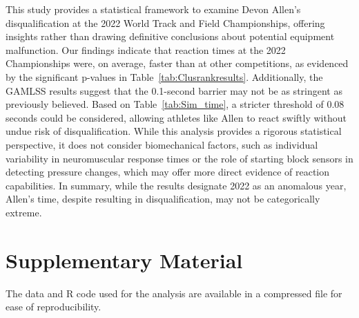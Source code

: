 \documentclass[12pt, letterpaper]{article}
\begin{document}
This study provides a statistical framework to examine Devon Allen’s
disqualification at the 2022 World Track and Field Championships,
offering insights rather than drawing definitive conclusions about
potential equipment malfunction. Our findings indicate that reaction
times at the 2022 Championships were, on average, faster than at other
competitions, as evidenced by the significant p-values in
Table~\ref{tab:Clusrankresults}. Additionally, the GAMLSS results
suggest that the 0.1-second barrier may not be as stringent as
previously believed. Based on Table~\ref{tab:Sim_time}, a stricter
threshold of 0.08 seconds could be considered, allowing athletes like
Allen to react swiftly without undue risk of disqualification. While
this analysis provides a rigorous statistical perspective, it does not
consider biomechanical factors, such as individual variability in
neuromuscular response times or the role of starting block sensors in
detecting pressure changes, which may offer more direct evidence of
reaction capabilities. In summary, while the results designate 2022 as
an anomalous year, Allen’s time, despite resulting in
disqualification, may not be categorically extreme.


\section*{Supplementary Material}
The data and R code used for the analysis are available in a compressed file for
ease of reproducibility.



\end{document}

